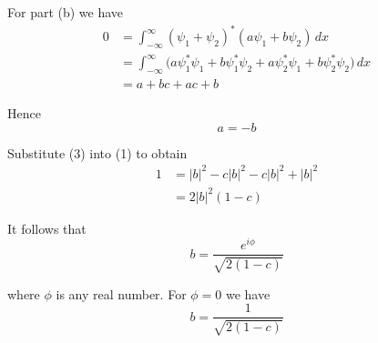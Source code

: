 For part (b) we have
\begin{align*}
0&=\int_{-\infty}^\infty
(\psi_1+\psi_2)^*(a\psi_1+b\psi_2)\,dx
\\
&=\int_{-\infty}^\infty
\bigl(
a\psi_1^*\psi_1
+b\psi_1^*\psi_2
+a\psi_2^*\psi_1
+b\psi_2^*\psi_2
\bigr)\,dx
\\
&=a+bc+ac+b
\end{align*}

Hence
\begin{equation*}
a=-b
\tag{3}
\end{equation*}

Substitute (3) into (1) to obtain
\begin{align*}
1&=|b|^2-c|b|^2-c|b|^2+|b|^2
\\
&=2|b|^2(1-c)
\end{align*}

It follows that
\begin{equation*}
b=\frac{e^{i\phi}}{\sqrt{2(1-c)}}
\end{equation*}

where $\phi$ is any real number.
For $\phi=0$ we have
\begin{equation*}
b=\frac{1}{\sqrt{2(1-c)}}
\end{equation*}


